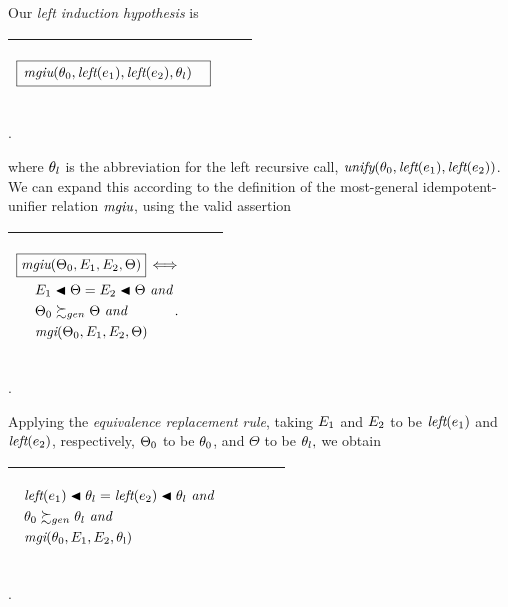 \documentclass[runningheads]{llncs}
\DeclareMathOperator{\uand}{\emph{and}\,}
\DeclareMathOperator{\uiff}{\iff}
\DeclareMathOperator{\unify}{\emph{unify}}
\DeclareMathOperator{\lef}{\emph{left}}
\DeclareMathOperator{\mgi}{\emph{mgi}}
\DeclareMathOperator{\mgiu}{\emph{mgiu}}
\DeclareMathOperator{\ul}{\thet{l}}
\begin{document}
Our \emph{left induction hypothesis} is
  \begin{center}
  \begin{tabular}{|m{}|m{}||m{}|}
\hline
\begin{center}
$\boxed{\begin{aligned}
    {\,\mgiu}(&\thet{0}, \lef(\e{1}), \lef(\e{2}), \thet{l}) 
\end{aligned}}  $  \hspace{1cm} 
\end{center}& &  \\  \hline
\end{tabular}.
\end{center}
where $\theta_{l}$ is the abbreviation for the left recursive call, $\unify(\thet{0}, \lef(\e{1}), \lef(\e{2}))$. We can expand this according to the definition of the most-general idempotent-unifier relation $\mgiu$, using the valid assertion
\begin{center}
  \begin{tabular}{|m{}|m{}||m{}|}
\hline
 \begin{center} 
${\begin{aligned} 
 &\boxed{\mgiu(\Thet{0}, \E{1}, \E{2}, \Theta)} \uiff \\
 &\quad\begin{aligned}
&\E{1} \apply \Theta = \E{2} \apply \Theta \, \uand 
 \\
 \,\, & \Thet{0} \moregen \Theta \, \uand
\\
  \,\, & {\mgi}(\Thet{0}, \E{1}, \E{2}, \Theta)
\end{aligned}.\end{aligned}}$\hspace{1cm} 
\end{center}& &  \\  \hline
\end{tabular}.
\end{center}
Applying the \emph{equivalence replacement rule}, taking $E_{1}$ and $E_{2}$ to be $\lef(\e{1})$ and  $\lef(\e{2})$, respectively, $\Theta_{0}$ to be $\theta_{0}$, and $\Theta$ to be $\allowbreak \theta_{l},$ we obtain
  \begin{center}
  \begin{tabular}{|m{}|m{}||m{}|}
\hline
\begin{center}
{$\begin{aligned}
 &\begin{aligned}
 &\begin{aligned}
&\lef(\e{1}) \apply \thet{l} = 
 \lef(\e{2}) \apply \thet{l} \, \uand 
 \\
 \,\, &\, \thet{0} \moregen  \thet{l} \, \uand
\\
  \,\, &\, {\mgi}(\thet{0}, \E{1}, \E{2}, \ul)
\end{aligned}
\end{aligned}\end{aligned}   $} 
\end{center}& &  \\  \hline
\end{tabular}.
\end{center}
\end{document}
